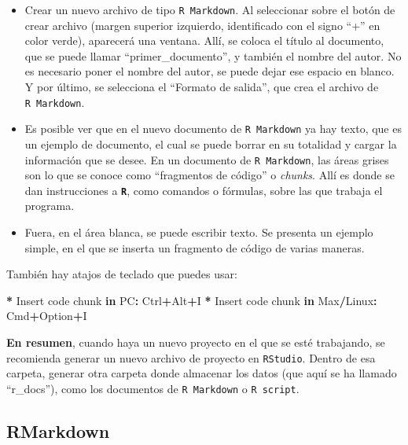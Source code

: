 \documentclass[
]{article}
\newenvironment{Shaded}{\begin{snugshade}}{\end{snugshade}}
\newcommand{\ControlFlowTok}[1]{\textcolor[rgb]{0.13,0.29,0.53}{\textbf{#1}}}
\newcommand{\NormalTok}[1]{#1}
\newcommand{\SpecialCharTok}[1]{\textcolor[rgb]{0.81,0.36,0.00}{\textbf{#1}}}
\begin{document}
\begin{itemize}
\item
  Crear un nuevo archivo de tipo \texttt{R\ Markdown}. Al seleccionar sobre el botón de crear archivo (margen superior izquierdo, identificado con el signo ``+'' en color verde), aparecerá una ventana. Allí, se coloca el título al documento, que se puede llamar ``primer\_documento'', y también el nombre del autor. No es necesario poner el nombre del autor, se puede dejar ese espacio en blanco. Y por último, se selecciona el ``Formato de salida'', que crea el archivo de \texttt{R\ Markdown}.
\item
  Es posible ver que en el nuevo documento de \texttt{R\ Markdown} ya hay texto, que es un ejemplo de documento, el cual se puede borrar en su totalidad y cargar la información que se desee. En un documento de \texttt{R\ Markdown}, las áreas grises son lo que se conoce como ``fragmentos de código'' o \emph{chunks}. Allí es donde se dan instrucciones a \textbf{\texttt{R}}, como comandos o fórmulas, sobre las que trabaja el programa.
\item
  Fuera, en el área blanca, se puede escribir texto. Se presenta un ejemplo simple, en el que se inserta un fragmento de código de varias maneras.
\end{itemize}

También hay atajos de teclado que puedes usar:

\begin{Shaded}
\begin{Highlighting}[]
\SpecialCharTok{*}\NormalTok{ Insert code chunk }\ControlFlowTok{in}\NormalTok{ PC}\SpecialCharTok{:}\NormalTok{ Ctrl}\SpecialCharTok{+}\NormalTok{Alt}\SpecialCharTok{+}\NormalTok{I}
\SpecialCharTok{*}\NormalTok{ Insert code chunk }\ControlFlowTok{in}\NormalTok{ Max}\SpecialCharTok{/}\NormalTok{Linux}\SpecialCharTok{:}\NormalTok{ Cmd}\SpecialCharTok{+}\NormalTok{Option}\SpecialCharTok{+}\NormalTok{I}
\end{Highlighting}
\end{Shaded}

\textbf{En resumen}, cuando haya un nuevo proyecto en el que se esté trabajando, se recomienda generar un nuevo archivo de proyecto en \texttt{RStudio}. Dentro de esa carpeta, generar otra carpeta donde almacenar los datos (que aquí se ha llamado ``r\_docs''), como los documentos de \texttt{R\ Markdown} o \texttt{R\ script}.

\hypertarget{rmarkdown}{%
\subsection{RMarkdown}\label{rmarkdown}}
\end{document}
